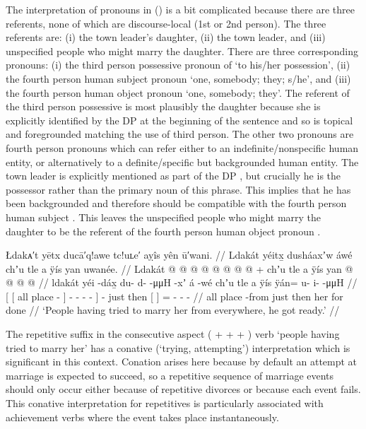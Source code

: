 The interpretation of pronouns in (\lastx) is a bit complicated because there are three referents, none of which are discourse-local (1st or 2nd person).
The three referents are: (i) the town leader’s daughter, (ii) the town leader, and (iii) unspecified people who might marry the daughter.
There are three corresponding pronouns: (i) the third person possessive pronoun  of  ‘to his/her possession’, (ii) the fourth person human subject pronoun  ‘one, somebody; they; s/he’, and (iii) the fourth person human object pronoun  ‘one, somebody; they’.
The referent of the third person possessive is most plausibly the daughter because she is explicitly identified by the DP at the beginning of the sentence and so is topical and foregrounded matching the use of third person.
The other two pronouns are fourth person pronouns which can refer either to an 	indefinite/nonspecific human entity, or alternatively to a definite/specific but backgrounded human entity.
The town leader is explicitly mentioned as part of the DP , but crucially he is the possessor rather than the primary noun of this phrase.
This implies that he has been backgrounded and therefore should be compatible with the fourth person human subject .
This leaves the unspecified people who might marry the daughter to be the referent of the fourth person human object pronoun .

\ex\label{ex:89-151-ppl-try-marry-got-ready}%
%
\begingl
	\glpreamble	Łdakᴀ′t yētx ducā′q!awe tc!uʟe′ aỵîs yên ū′wani. //
	\glpreamble	Ldakát yéitx̱ dusháaxʼw áwé chʼu tle a ÿís yan uwanée. //
	\gla	{} {} Ldakát  @ {} {}
			 @ {} @ {} @ {} @ {} @ {} @ {} {}
		 @ {} +
		chʼu tle {} a ÿís {}
		yan @  @ {} @ {} @ {} //
	\glb	{} {} ldakát yéi -dáx̱ {}
			{} du- d-  -μμH -xʼ {} {}
		á -wé
		chʼu tle {} a ÿís {}
		ÿán= u- i-  -μμH //
	\glc	{}[ {}[ all place - {}]
			\· - -  - - \· {}]
		 -
		just then {}[   {}]
		= - -  - //
	\gld	{} {} all place -from {}
			 {} {} {} {} {} {} {} 
		 {}
		just then {} her for {}
		done  //
	\glft	‘People having tried to marry her from everywhere, he got ready.’
		//
\endgl
\xe

The repetitive suffix  in the consecutive aspect ( +  +  + ) verb  ‘people having tried to marry her’ has a conative (‘trying, attempting’) interpretation which is significant in this context.
Conation arises here because by default an attempt at marriage is expected to succeed, so a repetitive sequence of marriage events should only occur either because of repetitive divorces or because each event fails.
This conative interpretation for repetitives is particularly associated with achievement verbs where the event takes place instantaneously.

